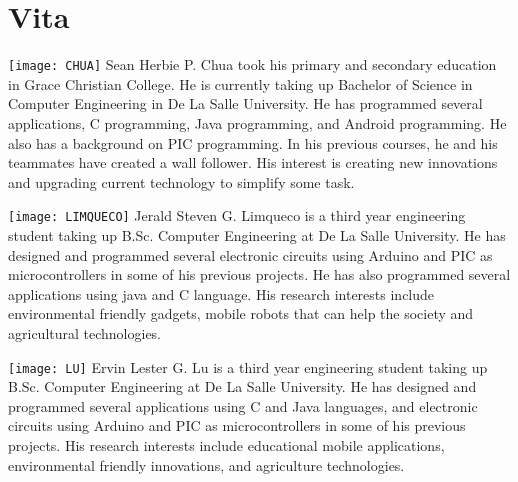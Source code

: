 \chapter{Vita}






\texttt{[image: CHUA]}
Sean Herbie P. Chua took his primary and secondary education in Grace Christian College. He is currently taking up Bachelor of Science in Computer Engineering in De La Salle University. He has programmed several applications, C programming, Java programming, and Android programming. He also has a background on PIC programming. In his previous courses, he and his teammates have created a wall follower. His interest is creating new innovations and upgrading current technology to simplify some task.

\vfill

\texttt{[image: LIMQUECO]}
Jerald Steven G. Limqueco is a third year engineering student taking up B.Sc. Computer Engineering at De La Salle University. He has designed and programmed several electronic circuits using Arduino and PIC as microcontrollers in some of his previous projects. He has also programmed several applications using java and C language. His research interests include environmental friendly gadgets, mobile robots that can help the society and agricultural technologies.

\vfill

\cleardoublepage

\texttt{[image: LU]}
Ervin Lester G. Lu is a third year engineering student taking up B.Sc. Computer Engineering at De La Salle University. He has designed and programmed several applications using C and Java languages, and electronic circuits using Arduino and PIC as microcontrollers in some of his previous projects. His research interests include educational mobile applications, environmental friendly innovations, and agriculture technologies.

